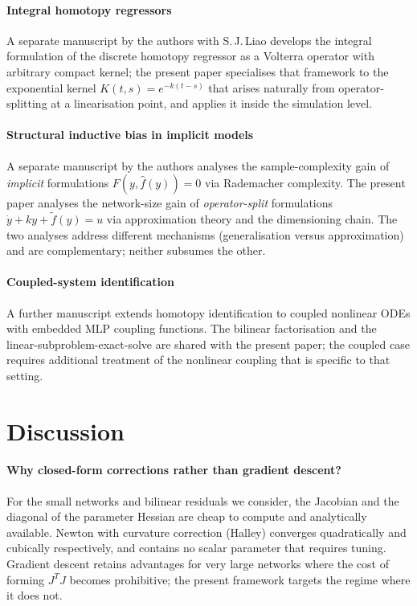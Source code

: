 \documentclass[preprint,12pt,numbers]{elsarticle}
\begin{document}
\paragraph{Integral homotopy regressors} A separate manuscript by the
authors with S.\,J.\,Liao \cite{Rodrigo2026integral} develops the
integral formulation of the discrete homotopy regressor as a Volterra
operator with arbitrary compact kernel; the present paper specialises
that framework to the exponential kernel $K(t,s) = e^{-k(t-s)}$ that
arises naturally from operator-splitting at a linearisation point, and
applies it inside the simulation level.

\paragraph{Structural inductive bias in implicit models} A separate
manuscript by the authors \cite{Rodrigo2026implicit} analyses the
sample-complexity gain of \emph{implicit} formulations
$F(y, \hat{f}(y)) = 0$ via Rademacher complexity. The present paper
analyses the network-size gain of \emph{operator-split} formulations
$\dot{y} + ky + \tilde{f}(y) = u$ via approximation theory and the
dimensioning chain. The two analyses address different mechanisms
(generalisation versus approximation) and are complementary; neither
subsumes the other.

\paragraph{Coupled-system identification} A further manuscript
\cite{Rodrigo2026coupled} extends homotopy identification to coupled
nonlinear ODEs with embedded MLP coupling functions. The bilinear
factorisation and the linear-subproblem-exact-solve are shared with
the present paper; the coupled case requires additional treatment of
the nonlinear coupling that is specific to that setting.


\section{Discussion}
\label{sec:discussion}

\paragraph{Why closed-form corrections rather than gradient descent?}
For the small networks and bilinear residuals we consider, the Jacobian
and the diagonal of the parameter Hessian are cheap to compute and
analytically available. Newton with curvature correction (Halley)
converges quadratically and cubically respectively, and contains no
scalar parameter that requires tuning. Gradient descent retains
advantages for very large networks where the cost of forming
$J^TJ$ becomes prohibitive; the present framework targets the regime
where it does not.
\end{document}
